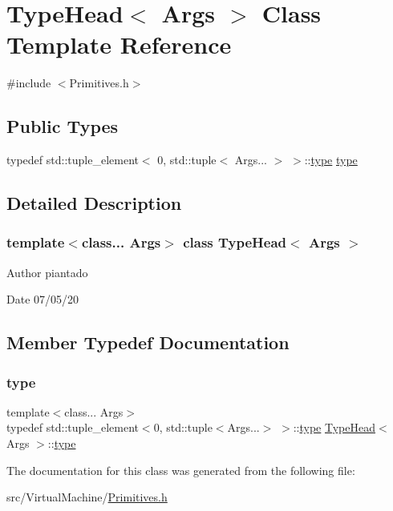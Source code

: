 \hypertarget{struct_type_head}{}\section{Type\+Head$<$ Args $>$ Class Template Reference}
\label{struct_type_head}


{\ttfamily \#include $<$Primitives.\+h$>$}

\subsection*{Public Types}
\begin{DoxyCompactItemize}
\item 
typedef std\+::tuple\+\_\+element$<$ 0, std\+::tuple$<$ Args... $>$ $>$\+::\hyperlink{struct_type_head_a9595415877619fea585771991836e9a2}{type} \hyperlink{struct_type_head_a9595415877619fea585771991836e9a2}{type}
\end{DoxyCompactItemize}


\subsection{Detailed Description}
\subsubsection*{template$<$class... Args$>$\newline
class Type\+Head$<$ Args $>$}

\begin{DoxyAuthor}{Author}
piantado 
\end{DoxyAuthor}
\begin{DoxyDate}{Date}
07/05/20 
\end{DoxyDate}


\subsection{Member Typedef Documentation}
\mbox{\label{struct_type_head_a9595415877619fea585771991836e9a2}} 
\subsubsection{\texorpdfstring{type}{type}}
{\footnotesize\ttfamily template$<$class... Args$>$ \\
typedef std\+::tuple\+\_\+element$<$0, std\+::tuple$<$Args...$>$ $>$\+::\hyperlink{struct_type_head_a9595415877619fea585771991836e9a2}{type} \hyperlink{struct_type_head}{Type\+Head}$<$ Args $>$\+::\hyperlink{struct_type_head_a9595415877619fea585771991836e9a2}{type}}



The documentation for this class was generated from the following file\+:\begin{DoxyCompactItemize}
\item 
src/\+Virtual\+Machine/\hyperlink{_primitives_8h}{Primitives.\+h}\end{DoxyCompactItemize}
